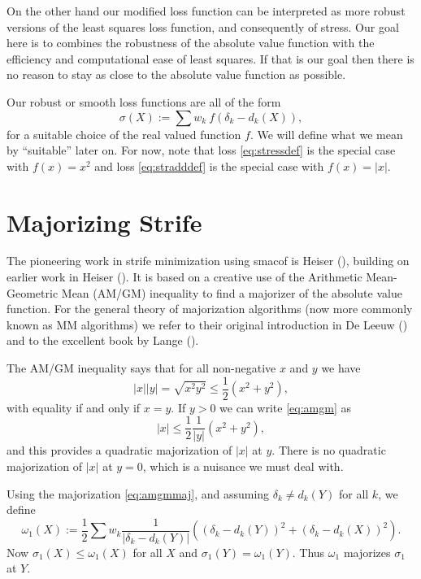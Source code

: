 \documentclass[
  12pt,
  letterpaper,
  DIV=11,
  numbers=noendperiod]{scrartcl}
\newcommand{\sectionbreak}{\pagebreak}
\theoremstyle{plain}
\theoremstyle{remark}
\begin{document}
On the other hand our modified loss function can be interpreted as more
robust versions of the least squares loss function, and consequently of
stress. Our goal here is to combines the robustness of the absolute
value function with the efficiency and computational ease of least
squares. If that is our goal then there is no reason to stay as close to
the absolute value function as possible.

Our robust or smooth loss functions are all of the form \begin{equation}
\sigma(X):=\sum w_k\ f(\delta_k-d_k(X))\label{eq:strifedef},
\end{equation} for a suitable choice of the real valued function \(f\).
We will define what we mean by ``suitable'' later on. For now, note that
loss \eqref{eq:stressdef} is the special case with \(f(x)=x^2\) and loss
\eqref{eq:stradddef} is the special case with \(f(x)=|x|\).

\sectionbreak

\section{Majorizing Strife}\label{majorizing-strife}

The pioneering work in strife minimization using smacof is Heiser
(), building on earlier work in Heiser
(). It is based on a creative use of the
Arithmetic Mean-Geometric Mean (AM/GM) inequality to find a majorizer of
the absolute value function. For the general theory of majorization
algorithms (now more commonly known as MM algorithms) we refer to their
original introduction in De Leeuw ()
and to the excellent book by Lange ().

The AM/GM inequality says that for all non-negative \(x\) and \(y\) we
have \begin{equation}
|x||y|=\sqrt{x^2y^2}\leq\frac12(x^2+y^2),\label{eq:amgm}
\end{equation} with equality if and only if \(x=y\). If \(y>0\) we can
write \eqref{eq:amgm} as \begin{equation}
|x|\leq\frac12\frac{1}{|y|}(x^2+y^2),\label{eq:amgmmaj}
\end{equation} and this provides a quadratic majorization of \(|x|\) at
\(y\). There is no quadratic majorization of \(|x|\) at \(y=0\), which
is a nuisance we must deal with.

Using the majorization \eqref{eq:amgmmaj}, and assuming
\(\delta_k\not= d_k(Y)\) for all \(k\), we define \begin{equation}
\omega_1(X):=\frac12\sum w_k\frac{1}{|\delta_k-d_k(Y)|}((\delta_k-d_k(Y))^2+(\delta_k-d_k(X))^2).\label{eq:omegadef}
\end{equation} Now \(\sigma_1(X)\leq\omega_1(X)\) for all \(X\) and
\(\sigma_1(Y)=\omega_1(Y)\). Thus \(\omega_1\) majorizes \(\sigma_1\) at
\(Y\).
\end{document}
